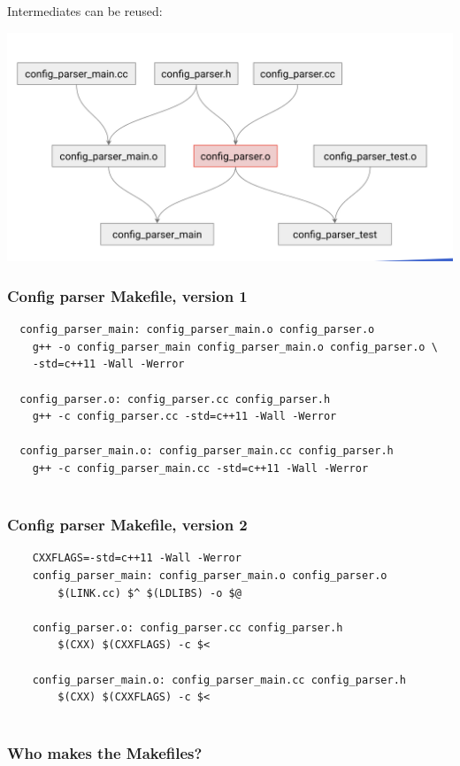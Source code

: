 \documentclass{article}
\begin{document}
Intermediates can be reused:
\begin{center}
    \includegraphics*[width=0.7\linewidth]{reusingIntermediates.png}
\end{center}

\subsubsection*{Config parser Makefile, version 1}

\begin{verbatim}
  config_parser_main: config_parser_main.o config_parser.o
    g++ -o config_parser_main config_parser_main.o config_parser.o \
    -std=c++11 -Wall -Werror
  
  config_parser.o: config_parser.cc config_parser.h
    g++ -c config_parser.cc -std=c++11 -Wall -Werror
  
  config_parser_main.o: config_parser_main.cc config_parser.h
    g++ -c config_parser_main.cc -std=c++11 -Wall -Werror
  
\end{verbatim}

\subsubsection*{Config parser Makefile, version 2}

\begin{verbatim}
    CXXFLAGS=-std=c++11 -Wall -Werror
    config_parser_main: config_parser_main.o config_parser.o
        $(LINK.cc) $^ $(LDLIBS) -o $@

    config_parser.o: config_parser.cc config_parser.h
        $(CXX) $(CXXFLAGS) -c $<

    config_parser_main.o: config_parser_main.cc config_parser.h
        $(CXX) $(CXXFLAGS) -c $<    
  
\end{verbatim}

\subsubsection{Who makes the Makefiles?}
\end{document}
